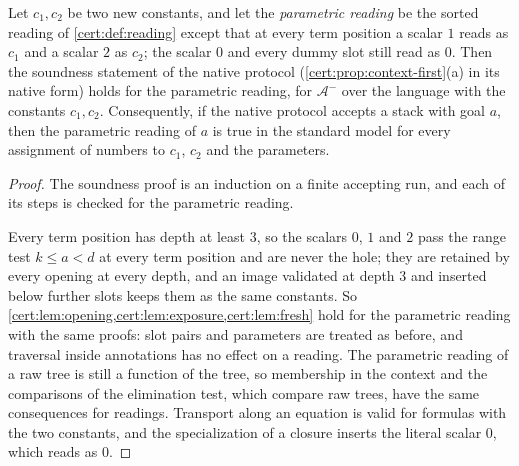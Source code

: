 \begin{proposition}\label{cert:prop:reserved}
Let $c_1,c_2$ be two new constants, and let the \emph{parametric reading} be
the sorted reading of \cref{cert:def:reading} except that at every term
position a scalar $1$ reads as $c_1$ and a scalar $2$ as $c_2$; the scalar
$0$ and every dummy slot still read as $0$. Then the soundness statement of
the native protocol (\cref{cert:prop:context-first}(a) in its native form)
holds for the parametric reading, for $\mathcal A^{-}$ over the language with
the constants $c_1,c_2$. Consequently, if the native protocol accepts a stack
with goal $a$, then the parametric reading of $a$ is true in the standard
model for every assignment of numbers to $c_1$, $c_2$ and the parameters.
\end{proposition}
\begin{proof}
The soundness proof is an induction on a finite accepting run, and each of its
steps is checked for the parametric reading.

Every term position has depth at least $3$, so the scalars $0$, $1$ and $2$
pass the range test $k\le a<d$ at every term position and are never the
hole; they are retained by every opening at every depth, and an image
validated at depth $3$ and inserted below further slots keeps them as the
same constants. So \cref{cert:lem:opening,cert:lem:exposure,cert:lem:fresh}
hold for the parametric reading with the same proofs: slot pairs and
parameters are treated as before, and traversal inside annotations has no
effect on a reading. The parametric reading of a raw tree is still a
function of the tree, so membership in the context and the comparisons of the
elimination test, which compare raw trees, have the same consequences for
readings. Transport along an equation is valid for formulas with the two
constants, and the specialization of a closure inserts the literal scalar $0$,
which reads as $0$.


\end{proof}
